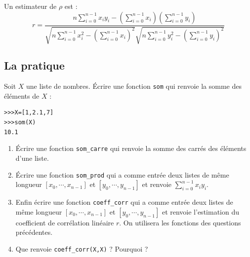 \noindent Un estimateur de $\rho$ est :\\
\[r=\dfrac{n\displaystyle \sum_{i=0}^{n-1}  x_iy_i-\left(\displaystyle\sum_{i=0}^{n-1}   x_i\right)\left(\displaystyle\sum_{i=0}^{n-1}   y_i\right)}{\sqrt{n\displaystyle\sum_{i=0}^{n-1}   x_i^2-\left(\displaystyle\sum_{i=0}^{n-1}   x_i\right)^2}\sqrt{n\displaystyle\sum_{i=0}^{n-1}   y_i^2-\left(\displaystyle\sum_{i=0}^{n-1}   y_i\right)^2}}\]

\subsection{La pratique}

\begin{exercice}
Soit $X$ une liste de nombres. \' Ecrire une fonction \verb?som? qui renvoie la somme des \' el\' ements de $X$ :
 \begin{verbatim}
>>>X=[1,2.1,7]
>>>som(X)
10.1
\end{verbatim}
\end{exercice}

\begin{exercice}
\begin{enumerate}
\item \' Ecrire une fonction \verb?som_carre? qui renvoie la somme des carr\' es  des \' el\' ements d'une liste.
\item \' Ecrire une fonction \verb?som_prod? qui a comme entr\' ee deux listes de m\^ eme longueur $[x_0,\cdots,x_{n-1}]$ et $[y_0,\cdots,y_{n-1}]$ et renvoie $\displaystyle\sum_{i=0}^{n-1} x_iy_i$.
\item Enfin \' ecrire une fonction \verb?coeff_corr? qui a comme entr\' ee deux listes de m\^ eme longueur $[x_0,\cdots,x_{n-1}]$ et $[y_0,\cdots,y_{n-1}]$ et renvoie l'estimation du coefficient de corr\' elation lin\' eaire $r$. On utilisera les fonctions des questions pr\' ec\' edentes.
\item Que renvoie \verb?coeff_corr(X,X)? ? Pourquoi ?
\end{enumerate}
\end{exercice}



